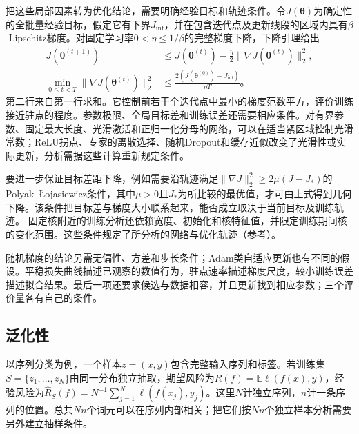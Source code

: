 把这些局部因素转为优化结论，需要明确经验目标和轨迹条件。令$J(\bm\theta)$为确定性的全批量经验目标，假定它有下界$J_{\inf}$，并在包含迭代点及更新线段的区域内具有$\beta$-Lipschitz梯度。对固定学习率$0<\eta\leq1/\beta$的完整梯度下降，下降引理给出
\begin{equation}
  \begin{aligned}
    J(\bm\theta^{(t+1)})
      &\leq J(\bm\theta^{(t)})-\frac\eta2
                   \lVert\nabla J(\bm\theta^{(t)})\rVert_2^2,\\
    \min_{0\leq t<T}\lVert\nabla J(\bm\theta^{(t)})\rVert_2^2
      &\leq\frac{2(J(\bm\theta^{(0)})-J_{\inf})}{\eta T}\text{。}
  \end{aligned}
  \label{eq:transformer-stationary-convergence}
\end{equation}
第二行来自第一行求和。它控制前若干个迭代点中最小的梯度范数平方，评价训练接近驻点的程度。参数极限、全局目标差和训练误差还需要相应条件。对有界参数、固定最大长度、光滑激活和正归一化分母的网络，可以在适当紧区域控制光滑常数；ReLU拐点、专家的离散选择、随机Dropout和缓存近似改变了光滑性或实际更新，分析需据这些计算重新规定条件。

要进一步保证目标差距下降，例如需要沿轨迹满足$\lVert\nabla J\rVert_2^2\geq2\mu(J-J_*)$的Polyak--Łojasiewicz条件，其中$\mu>0$且$J_*$为所比较的最优值，才可由上式得到几何下降。该条件把目标差与梯度大小联系起来，能否成立取决于当前目标及训练轨迹。
固定核附近的训练分析还依赖宽度、初始化和核特征值，并限定训练期间核的变化范围。这些条件规定了所分析的网络与优化轨迹（参考）。

随机梯度的结论另需无偏性、方差和步长条件；Adam类自适应更新也有不同的假设。平稳损失曲线描述已观察的数值行为，驻点速率描述梯度尺度，较小训练误差描述拟合结果。最后一项还要求候选与数据相容，并且更新找到相应参数；三个评价量各有自己的条件。

\subsection{泛化性}
\label{sec:transformer-model-generalization}

以序列分类为例，一个样本$z=(x,y)$包含完整输入序列和标签。若训练集$S=\{z_1,\ldots,z_N\}$由同一分布独立抽取，期望风险为$R(f)=\mathbb E\ell(f(x),y)$，经验风险为$\widehat R_S(f)=N^{-1}\sum_{j=1}^N\ell(f(x_j),y_j)$。这里$N$计独立序列，$n$计一条序列的位置。总共$Nn$个词元可以在序列内部相关；把它们按$Nn$个独立样本分析需要另外建立抽样条件。

